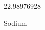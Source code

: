 \documentclass[12pt]{article}
\begin{document}
\hfill{}
\vfill
\begin{center}
  {\fontsize{50}{60}
  }

  22.98976928

Sodium
\end{center}
\vfill
\end{document}
